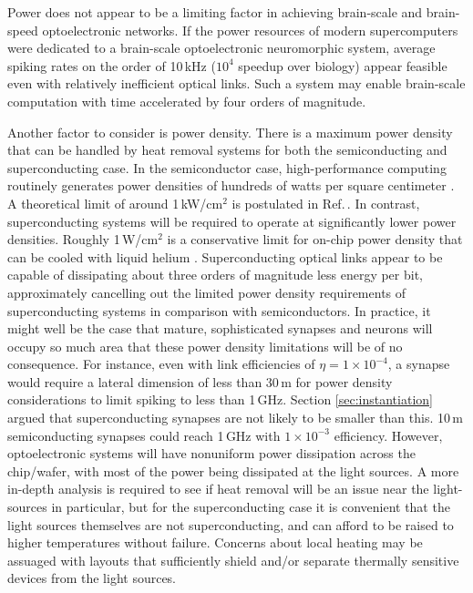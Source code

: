 \documentclass[twocolumn]{article}
\begin{document}
Power does not appear to be a limiting factor in achieving brain-scale and brain-speed optoelectronic networks. If the power resources of modern supercomputers were dedicated to a brain-scale optoelectronic neuromorphic system, average spiking rates on the order of 10\,kHz ($10^{4}$ speedup over biology) appear feasible even with relatively inefficient optical links. Such a system may enable brain-scale computation with time accelerated by four orders of magnitude.

Another factor to consider is power density. There is a maximum power density that can be handled by heat removal systems for both the semiconducting and superconducting case. In the semiconductor case, high-performance computing routinely generates power densities of hundreds of watts per square centimeter \cite{tolpygo2016superconductor}. A theoretical limit of around 1\,kW/cm$^2$ is postulated in Ref.\,. In contrast, superconducting systems will be required to operate at significantly lower power densities. Roughly 1\,W/cm$^2$ is a conservative limit for on-chip power density that can be cooled with liquid helium \cite{tolpygo2016superconductor}. Superconducting optical links appear to be capable of dissipating about three orders of magnitude less energy per bit, approximately cancelling out the limited power density requirements of superconducting systems in comparison with semiconductors. In practice, it might well be the case that mature, sophisticated synapses and neurons will occupy so much area that these power density limitations will be of no consequence. For instance, even with link efficiencies of $\eta = 1 \times 10^{-4}$, a synapse would require a lateral dimension of less than 30\,\textmu m for power density considerations to limit spiking to less than 1\,GHz. Section \ref{sec:instantiation} argued that superconducting synapses are not likely to be smaller than this. 10\,\textmu m semiconducting synapses could reach 1\,GHz with $1 \times 10^{-3}$ efficiency. However, optoelectronic systems will have nonuniform power dissipation across the chip/wafer, with most of the power being dissipated at the light sources. A more in-depth analysis is required to see if heat removal will be an issue near the light-sources in particular, but for the superconducting case it is convenient that the light sources themselves are not superconducting, and can afford to be raised to higher temperatures without failure. Concerns about local heating may be assuaged with layouts that sufficiently shield and/or separate thermally sensitive devices from the light sources.
\end{document}
